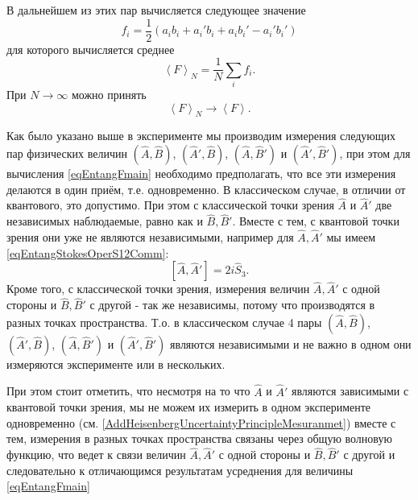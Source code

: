 В дальнейшем из этих пар вычисляется следующее значение
\begin{equation}
f_i = \frac{1}{2}\left(
a_i b_i + a_i' b_i + a_i b_i' - a_i' b_i'
\right)
\nonumber
\end{equation}
для которого вычисляется среднее
\begin{equation}
\left<F\right>_N = \frac{1}{N}\sum_i f_i.
\label{eqEntangFmain}
\end{equation}
При $N \rightarrow \infty$ можно принять
\begin{equation}
\left<F\right>_N \rightarrow \left<F\right>.
\nonumber
\end{equation}

\begin{remark}
Как было указано выше в эксперименте мы производим измерения следующих
пар физических величин $\left(\hat{A},\hat{B}\right)$,
$\left(\hat{A}',\hat{B}\right)$, $\left(\hat{A},\hat{B}'\right)$ и
$\left(\hat{A}',\hat{B}'\right)$, при этом для вычисления
\eqref{eqEntangFmain} необходимо предполагать, что все эти измерения
делаются в один приём, т.е. одновременно. В классическом случае, в
отличии от квантового, это допустимо. При этом с
классической точки зрения $\hat{A}$ и $\hat{A}'$ две независимых
наблюдаемые, 
равно как и $\hat{B},\hat{B}'$. Вместе с тем, с квантовой точки зрения
они уже не являются независимыми, например для $\hat{A}, \hat{A}'$ мы
имеем \eqref{eqEntangStokesOperS12Comm}:
\[
\left[\hat{A}, \hat{A}'\right] = 2 i \hat{S}_3.
\] 
Кроме того, с классической точки зрения, измерения величин
$\hat{A}, \hat{A}'$ с одной стороны и $\hat{B}, \hat{B}'$ с другой - так же 
независимы, потому что производятся в разных точках пространства.
Т.о. в классическом случае 4 пары $\left(\hat{A},\hat{B}\right)$,
$\left(\hat{A}',\hat{B}\right)$, $\left(\hat{A},\hat{B}'\right)$ и
$\left(\hat{A}',\hat{B}'\right)$ 
являются независимыми и не важно в одном они измеряются эксперименте
или в нескольких. 

При этом стоит отметить, что несмотря на то что $\hat{A}$ и $\hat{A}'$
являются зависимыми с квантовой точки зрения, мы не можем их измерить
в одном эксперименте одновременно (см.
\autoref{AddHeisenbergUncertaintyPrincipleMesuranmet}) вместе с тем,
измерения в разных точках пространства связаны через общую волновую
функцию, что ведет к связи величин $\hat{A},\hat{A}'$ с одной стороны и
$\hat{B}, \hat{B}'$ с другой и следовательно к отличающимся
результатам усреднения для величины \eqref{eqEntangFmain}
\end{remark}

